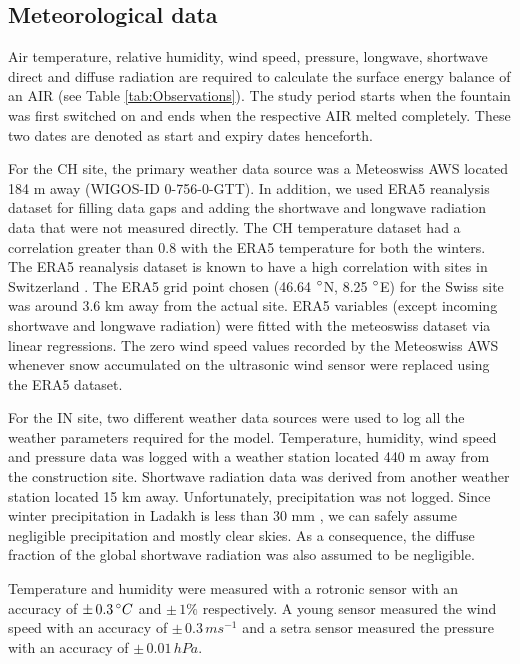 \documentclass[utf8]{frontiersSCNS}
\begin{document}
\subsection{Meteorological data}

Air temperature, relative humidity, wind speed, pressure, longwave, shortwave direct and diffuse radiation are
required to calculate the surface energy balance of an AIR (see Table \ref{tab:Observations}). The study period
starts when the fountain was first switched on and ends when the respective AIR melted completely. These two
dates are denoted as start and expiry dates henceforth.

For the CH site, the primary weather data source was a Meteoswiss AWS located 184 m away (WIGOS-ID 0-756-0-GTT).
In addition, we used ERA5 reanalysis dataset \citep{era5} for filling data gaps and adding the shortwave and
longwave radiation data that were not measured directly. The CH temperature dataset had a correlation greater
than 0.8 with the ERA5 temperature for both the winters. The ERA5 reanalysis dataset is known to have a high
correlation with sites in Switzerland \citep{Scherrer_2020}. The ERA5 grid point chosen (46.64 $\degree$N, 8.25
$\degree$E) for the Swiss site was around 3.6 km away from the actual site. ERA5 variables (except incoming
shortwave and longwave radiation) were fitted with the meteoswiss dataset via linear regressions. The zero wind
speed values recorded by the Meteoswiss AWS whenever snow accumulated on the ultrasonic wind sensor were
replaced using the ERA5 dataset. 

For the IN site, two different weather data sources were used to log all the weather parameters required for the
model. Temperature, humidity, wind speed and pressure data was logged with a weather station located 440 m away
from the construction site. Shortwave radiation data was derived from another weather station located 15 km
away. Unfortunately, precipitation was not logged. Since winter precipitation in Ladakh is less than 30 mm
\citep{Nusser_2012}, we can safely assume negligible precipitation and mostly clear skies. As a consequence, the
diffuse fraction of the global shortwave radiation was also assumed to be negligible.

Temperature and humidity were measured with a rotronic sensor with an accuracy of $\pm\,0.3\, \degree C$ and
$\pm\,1 \%$ respectively. A young sensor measured the wind speed with an accuracy of $\pm\,0.3\, ms^{-1}$ and a
setra sensor measured the pressure with an accuracy of $\pm\,0.01\, hPa$. 
\end{document}
